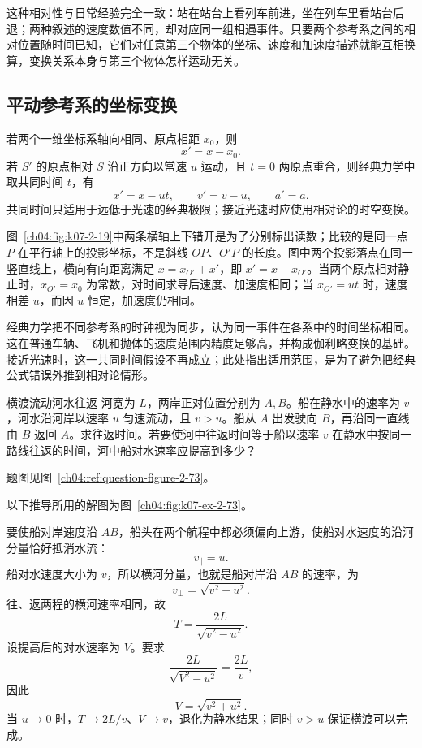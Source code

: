 {这种相对性与日常经验完全一致：站在站台上看列车前进，坐在列车里看站台后退；两种叙述的速度数值不同，却对应同一组相遇事件。只要两个参考系之间的相对位置随时间已知，它们对任意第三个物体的坐标、速度和加速度描述就能互相换算，变换关系本身与第三个物体怎样运动无关。

\subsection*{平动参考系的坐标变换}

\ReferenceFramesDiagram

若两个一维坐标系轴向相同、原点相距 $x_0$，则
\begin{equation}
x'=x-x_0.
\end{equation}
若 $S'$ 的原点相对 $S$ 沿正方向以常速 $u$ 运动，且 $t=0$ 两原点重合，则经典力学中取共同时间 $t$，有
\begin{equation}
x'=x-ut,\qquad v'=v-u,\qquad a'=a.
\end{equation}
共同时间只适用于远低于光速的经典极限；接近光速时应使用相对论的时空变换。

图~\ref{ch04:fig:k07-2-19}中两条横轴上下错开是为了分别标出读数；比较的是同一点 $P$ 在平行轴上的投影坐标，不是斜线 $OP$、$O'P$ 的长度。图中两个投影落点在同一竖直线上，横向有向距离满足 $x=x_{O'}+x'$，即 $x'=x-x_{O'}$。当两个原点相对静止时，$x_{O'}=x_0$ 为常数，对时间求导后速度、加速度相同；当 $x_{O'}=ut$ 时，速度相差 $u$，而因 $u$ 恒定，加速度仍相同。

经典力学把不同参考系的时钟视为同步，认为同一事件在各系中的时间坐标相同。这在普通车辆、飞机和抛体的速度范围内精度足够高，并构成伽利略变换的基础。接近光速时，这一共同时间假设不再成立；此处指出适用范围，是为了避免把经典公式错误外推到相对论情形。

\begin{origexamplebox}{横渡流动河水往返}\label{ch04:ex:k07-2-73}
河宽为 $L$，两岸正对位置分别为 $A,B$。船在静水中的速率为 $v$，河水沿河岸以速率 $u$ 匀速流动，且 $v>u$。船从 $A$ 出发驶向 $B$，再沿同一直线由 $B$ 返回 $A$。求往返时间。若要使河中往返时间等于船以速率 $v$ 在静水中按同一路线往返的时间，河中船对水速率应提高到多少？
\par 题图见图~\ref{ch04:ref:question-figure-2-73}。
\KQuestionCV
\end{origexamplebox}
\begin{xesolution}
以下推导所用的解图为图~\ref{ch04:fig:k07-ex-2-73}。

要使船对岸速度沿 $AB$，船头在两个航程中都必须偏向上游，使船对水速度的沿河分量恰好抵消水流：
\CrossRiverRoundTripDiagram
\[
v_{\parallel}=u.
\]
船对水速度大小为 $v$，所以横河分量，也就是船对岸沿 $AB$ 的速率，为
\[
v_{\perp}=\sqrt{v^2-u^2}.
\]
往、返两程的横河速率相同，故
\[
\boxed{T=\frac{2L}{\sqrt{v^2-u^2}}}.
\]
设提高后的对水速率为 $V$。要求
\[
\frac{2L}{\sqrt{V^2-u^2}}=\frac{2L}{v},
\]
因此
\[
\boxed{V=\sqrt{v^2+u^2}}.
\]
当 $u\to0$ 时，$T\to2L/v$、$V\to v$，退化为静水结果；同时 $v>u$ 保证横渡可以完成。
\end{xesolution}


}
